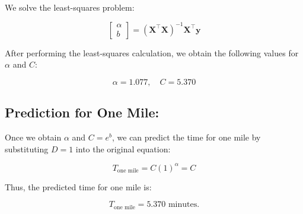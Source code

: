 \documentclass{article}
\begin{document}
We solve the least-squares problem:

\[
\begin{bmatrix} \alpha \\ b \end{bmatrix} = (\mathbf{X}^\top \mathbf{X})^{-1} \mathbf{X}^\top \mathbf{y}
\]

After performing the least-squares calculation, we obtain the following values for \( \alpha \) and \( C \):

\[
\alpha = 1.077, \quad C = 5.370
\]

\subsection{Prediction for One Mile:}

Once we obtain \( \alpha \) and \( C = e^b \), we can predict the time for one mile by substituting \( D = 1 \) into the original equation:

\[
T_{\text{one mile}} = C(1)^\alpha = C
\]

Thus, the predicted time for one mile is:

\[
T_{\text{one mile}} = 5.370 \text{ minutes}.
\]
\end{document}
